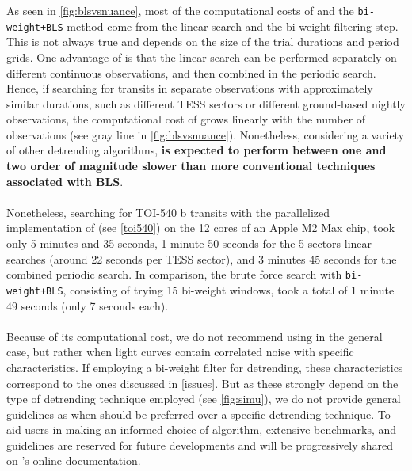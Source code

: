 \documentclass[modern]{aastex631}
\begin{document}
As seen in \autoref{fig:blsvsnuance}, most of the computational costs of \nuancecode{} and the \texttt{bi-weight+BLS} method come from the linear search and the bi-weight filtering step. This is not always true and depends on the size of the trial durations and period grids. One advantage of \nuancemethod{} is that the linear search can be performed separately on different continuous observations, and then combined in the periodic search. Hence, if searching for transits in separate observations with approximately similar durations, such as different TESS sectors or different ground-based nightly observations, the computational cost of \nuancecode{} grows linearly with the number of observations (see gray line in \autoref{fig:blsvsnuance}). Nonetheless, considering a variety of other detrending algorithms, \textbf{\nuancecode{} is expected to perform between one and two order of magnitude slower than more conventional techniques associated with BLS}.\\\\ 
Nonetheless, searching for TOI-540 b transits with the parallelized implementation of \nuancecode{} (see \autoref{toi540}) on the 12 cores of an Apple M2 Max chip, took only 5 minutes and 35 seconds, 1 minute 50 seconds for the 5 sectors linear searches (around 22 seconds per TESS sector), and 3 minutes 45 seconds for the combined periodic search. In comparison, the brute force search with \texttt{bi-weight+BLS}, consisting of trying 15 bi-weight windows, took a total of 1 minute 49 seconds (only 7 seconds each).\\\\
Because of its computational cost, we do not recommend using \nuancecode{} in the general case, but rather when light curves contain correlated noise with specific characteristics. If employing a bi-weight filter for detrending, these characteristics correspond to the ones discussed in \autoref{issues}. But as these strongly depend on the type of detrending technique employed (see \autoref{fig:simu}), we do not provide general guidelines as when \nuancemethod{} should be preferred over a specific detrending technique. To aid users in making an informed choice of algorithm, extensive benchmarks, and guidelines are reserved for future developments and will be progressively shared on \nuancecode{}'s online documentation.
\end{document}
